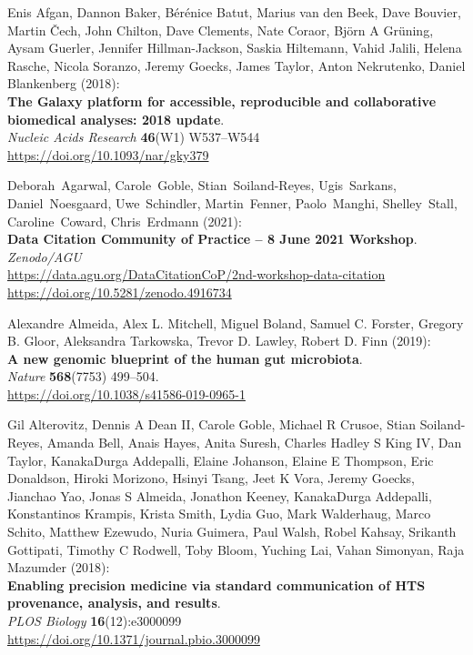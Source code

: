 
\begin{thebibliography}{9}

Enis Afgan, Dannon Baker, Bérénice Batut, Marius van
den Beek, Dave Bouvier, Martin Čech, John Chilton, Dave Clements, Nate
Coraor, Björn A Grüning, Aysam Guerler, Jennifer Hillman-Jackson, Saskia
Hiltemann, Vahid Jalili, Helena Rasche, Nicola Soranzo, Jeremy Goecks,
James Taylor, Anton Nekrutenko, Daniel Blankenberg (2018):\\
\textbf{The Galaxy platform for accessible, reproducible and
collaborative biomedical analyses: 2018 update}.\\
\emph{Nucleic Acids Research} \textbf{46}(W1) W537--W544\\
\url{https://doi.org/10.1093/nar/gky379}

Deborah~Agarwal, Carole~Goble, Stian~Soiland-Reyes,
Ugis~Sarkans, Daniel~Noesgaard, Uwe~Schindler, Martin~Fenner,
Paolo~Manghi, Shelley~Stall, Caroline~Coward, Chris~Erdmann (2021):\\
\textbf{Data Citation Community of Practice -- 8 June 2021 Workshop}.\\
\emph{Zenodo/AGU}\\
\url{https://data.agu.org/DataCitationCoP/2nd-workshop-data-citation}\\
\url{https://doi.org/10.5281/zenodo.4916734}

Alexandre Almeida, Alex L. Mitchell, Miguel Boland, Samuel C.
Forster, Gregory B. Gloor, Aleksandra Tarkowska, Trevor D. Lawley,
Robert D. Finn (2019):\\
\textbf{A new genomic blueprint of the human gut microbiota}.\\
\emph{Nature} \textbf{568}(7753) 499--504.\\
\url{https://doi.org/10.1038/s41586-019-0965-1}

Gil Alterovitz, Dennis A Dean II, Carole Goble, Michael R
Crusoe, Stian Soiland-Reyes, Amanda Bell, Anais Hayes, Anita Suresh,
Charles Hadley S King IV, Dan Taylor, KanakaDurga Addepalli, Elaine
Johanson, Elaine E Thompson, Eric Donaldson, Hiroki Morizono, Hsinyi
Tsang, Jeet K Vora, Jeremy Goecks, Jianchao Yao, Jonas S Almeida,
Jonathon Keeney, KanakaDurga Addepalli, Konstantinos Krampis, Krista
Smith, Lydia Guo, Mark Walderhaug, Marco Schito, Matthew Ezewudo, Nuria
Guimera, Paul Walsh, Robel Kahsay, Srikanth Gottipati, Timothy C
Rodwell, Toby Bloom, Yuching Lai, Vahan Simonyan, Raja Mazumder
(2018):\\
\textbf{Enabling precision medicine via standard communication of HTS
provenance, analysis, and results}.\\
\emph{PLOS Biology} \textbf{16}(12):e3000099\\
\url{https://doi.org/10.1371/journal.pbio.3000099}


\end{thebibliography}
